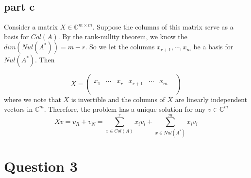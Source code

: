 \documentclass[a4paper,12pt]{article}
\begin{document}
\subsection{part c}

Consider a matrix $X \in \mathbb{C}^{m\times m}$. Suppose the columns of this matrix serve as a basis for $Col(A)$. By the rank-nullity theorem, we know the $dim(Nul(A^*))=m-r$. So we let the columns $x_{r+1}, \cdots, x_m$ be a basis for $Nul(A^*)$. Then

\begin{equation}
X=\begin{pmatrix}
	&	&	&	&	&	&  \\
x_1	&\cdots&x_r&x_{r+1}& \cdots&x_m\\
	&	&	&	&	&	&  \\
\end{pmatrix}
\end{equation}
where we note that $X$ is invertible and the columns of $X$ are linearly independent vectors in $\mathbb{C}^m$. Therefore, the problem has a unique solution for any $ v \in \mathbb{C}^m$
\begin{equation}
Xv=v_R + v_N =\sum_{x\in Col(A)}^r x_i v_i + \sum_{x\in Nul(A^*)}^m x_i v_i
\end{equation}

\section{Question 3}
\end{document}
